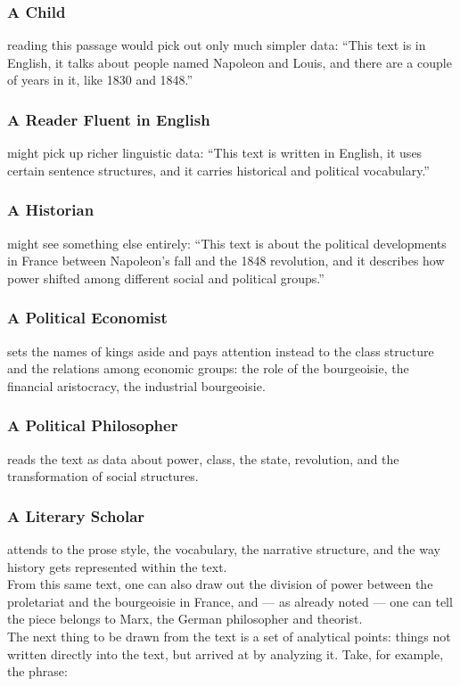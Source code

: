 \subsubsection{A Child}
reading this passage would pick out only much simpler data: ``This text is in English, it talks about people named Napoleon and Louis, and there are a couple of years in it, like 1830 and 1848.''

\subsubsection{A Reader Fluent in English}
might pick up richer linguistic data: ``This text is written in English, it uses certain sentence structures, and it carries historical and political vocabulary.''

\subsubsection{A Historian}
might see something else entirely: ``This text is about the political developments in France between Napoleon's fall and the 1848 revolution, and it describes how power shifted among different social and political groups.''

\subsubsection{A Political Economist}
sets the names of kings aside and pays attention instead to the class structure and the relations among economic groups: the role of the bourgeoisie, the financial aristocracy, the industrial bourgeoisie.

\subsubsection{A Political Philosopher}
reads the text as data about power, class, the state, revolution, and the transformation of social structures.

\subsubsection{A Literary Scholar}
attends to the prose style, the vocabulary, the narrative structure, and the way history gets represented within the text.\\
From this same text, one can also draw out the division of power between the proletariat and the bourgeoisie in France, and --- as already noted --- one can tell the piece belongs to Marx, the German philosopher and theorist.\\
The next thing to be drawn from the text is a set of analytical points: things not written directly into the text, but arrived at by analyzing it. Take, for example, the phrase:

